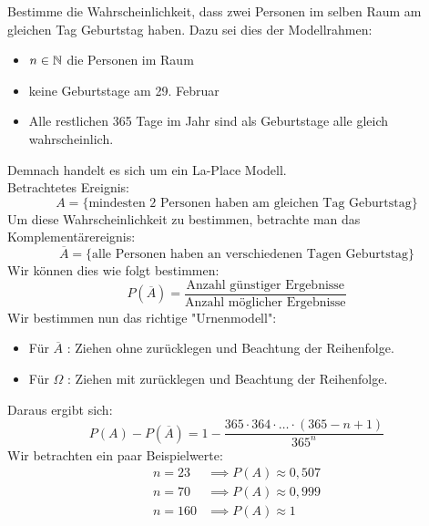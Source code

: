 \begin{example}[Geburtenparadoxon]
Bestimme die Wahrscheinlichkeit, dass zwei Personen im selben Raum am gleichen Tag Geburtstag haben. Dazu sei dies der Modellrahmen:
\begin{itemize}
	\item $n \in \mathbb{N}$ die Personen im Raum
	\item keine Geburtstage am 29. Februar
	\item Alle restlichen 365 Tage im Jahr sind als Geburtstage alle gleich wahrscheinlich.
\end{itemize}
Demnach handelt es sich um ein La-Place Modell. \\
Betrachtetes Ereignis:
\[
A = \{\text{mindesten 2 Personen haben am gleichen Tag Geburtstag}\} 
\]
Um diese Wahrscheinlichkeit zu bestimmen, betrachte man das Komplementärereignis:
\[
\overline{A}= \{\text{alle Personen haben an verschiedenen Tagen Geburtstag}\} 
\]
Wir können dies wie folgt bestimmen:
\[
P(\overline{A})=\frac{\text{Anzahl günstiger Ergebnisse}}{\text{Anzahl möglicher Ergebnisse}}
\]
Wir bestimmen nun das richtige "Urnenmodell":
\begin{itemize}
	\item Für $\overline{A}$ : Ziehen ohne zurücklegen und Beachtung der Reihenfolge.
	\item Für $\Omega$ : Ziehen mit zurücklegen und Beachtung der Reihenfolge.
\end{itemize}
Daraus ergibt sich:
\[
P(A)-P(\overline{A}) = 1- \frac{365\cdot 364\cdot \ldots\cdot (365-n+1)}{365^n}
\]
Wir betrachten ein paar Beispielwerte:
\begin{align*}
	n=23 &\implies P(A) \approx 0,507 \\
	n=70 &\implies P(A) \approx 0,999 \\
	n=160 &\implies P(A) \approx 1
\end{align*}
\end{example}
